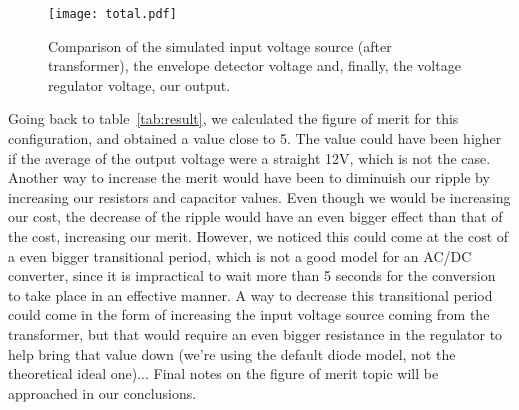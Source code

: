\begin{figure}[!h] \centering
\texttt{[image: total.pdf]}
\caption{Comparison of the simulated input voltage source (after transformer), the envelope detector voltage and, finally, the voltage regulator voltage, our output.}
\label{fig:total}
\end{figure}

Going back to table~\ref{tab:result}, we calculated the figure of merit for this configuration, and obtained a value close to 5. The value could have been higher if the average of the output voltage were a straight 12V, which is not the case. Another way to increase the merit would have been to diminuish our ripple by increasing our resistors and capacitor values. Even though we would be increasing our cost, the decrease of the ripple would have an even bigger effect than that of the cost, increasing our merit. However, we noticed this could come at the cost of a even bigger transitional period, which is not a good model for an AC/DC converter, since it is impractical to wait more than 5 seconds for the conversion to take place in an effective manner. A way to decrease this transitional period could come in the form of increasing the input voltage source coming from the transformer, but that would require an even bigger resistance in the regulator to help bring that value down (we're using the default diode model, not the theoretical ideal one)... Final notes on the figure of merit topic will be approached in our conclusions.

\par
